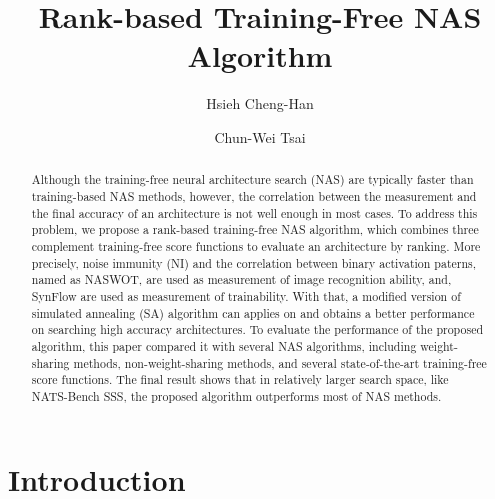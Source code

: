 \documentclass[sigconf]{acmart}
\begin{document}
\title{Rank-based Training-Free NAS Algorithm}

\author{Hsieh Cheng-Han}

\author{Chun-Wei Tsai}

\begin{abstract}

    Although the training-free neural architecture search (NAS) are typically 
    faster than training-based NAS methods, however, the correlation between 
    the measurement and the final accuracy of an architecture is not well 
    enough in most cases. 
    To address this problem, we propose a rank-based training-free NAS 
    algorithm, which combines three complement training-free score functions 
    to evaluate an architecture by ranking. 
    More precisely, noise immunity (NI) and the correlation between binary 
    activation paterns, named as NASWOT, are used as measurement of image recognition 
    ability, and, SynFlow are used as measurement of trainability. 
    With that, a modified version of simulated annealing (SA) algorithm 
    can applies on and obtains a better performance on searching high accuracy 
    architectures. 
    To evaluate the performance of the proposed algorithm, this paper compared 
    it with several NAS algorithms, including weight-sharing methods, 
    non-weight-sharing methods, and several state-of-the-art training-free score 
    functions. The final result shows that in relatively larger search space, 
    like NATS-Bench SSS, the proposed algorithm outperforms most of NAS methods. 

\end{abstract}
\maketitle

\section{Introduction}
\label{sec:introduction}
\end{document}
